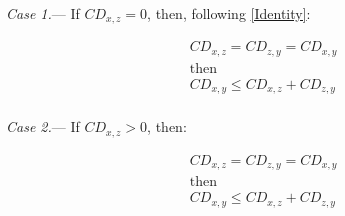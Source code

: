 \documentclass[12pt,letterpaper]{article}
\DeclarePairedDelimiter\abs{\lvert}{\rvert}%
\renewcommand{\subsubsection}[1]{%
\vspace{2ex}
\noindent
\textit{#1.}---}
\begin{document}
\subsubsection{Case 1}
If $CD_{x,z} = 0$, then, following \ref{Identity}:

\begin{equation}
    \label{subadditivity_demo_case1}
    \begin{aligned}
    &CD_{x,z} = CD_{z,y} = CD_{x,y}\\
    &\text{then}\\
    &CD_{x,y} \leq CD_{x,z} + CD_{z,y}\\
    \end{aligned}
\end{equation}

\subsubsection{Case 2}
If $CD_{x,z} > 0$, then:

\begin{equation}
    \label{subadditivity_demo_case2}
    \begin{aligned}
    &CD_{x,z} = CD_{z,y} = CD_{x,y}\\
    &\text{then}\\
    &CD_{x,y} \leq CD_{x,z} + CD_{z,y}\\
    \end{aligned}
\end{equation}

















\end{document}
